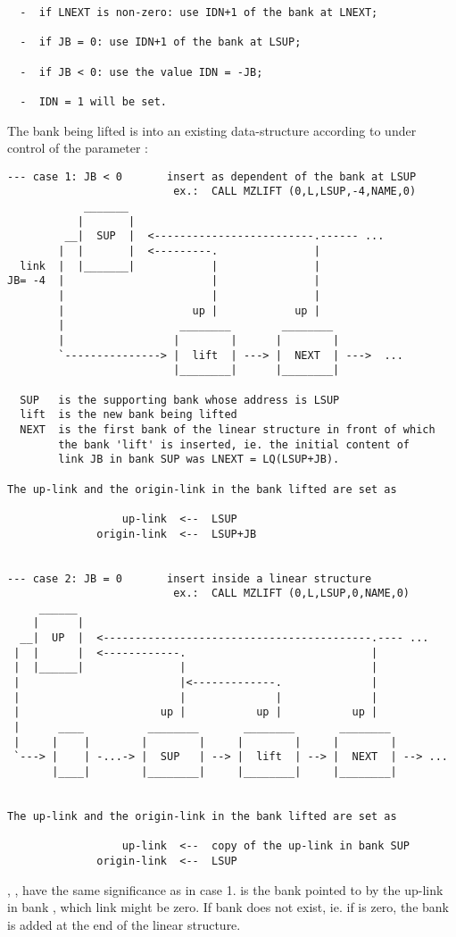 \begin{verbatim}
  -  if LNEXT is non-zero: use IDN+1 of the bank at LNEXT;

  -  if JB = 0: use IDN+1 of the bank at LSUP;

  -  if JB < 0: use the value IDN = -JB;

  -  IDN = 1 will be set.
\end{verbatim} 

The bank being lifted is 
into an existing data-structure according to 
under control of the parameter :

\begin{verbatim}
--- case 1: JB < 0       insert as dependent of the bank at LSUP
                          ex.:  CALL MZLIFT (0,L,LSUP,-4,NAME,0)
            _______
           |       |
         __|  SUP  |  <-------------------------.------ ...
        |  |       |  <---------.               |
  link  |  |_______|            |               |
JB= -4  |                       |               |
        |                       |               |
        |                    up |            up |
        |                  ________        ________
        |                 |        |      |        |
        `---------------> |  lift  | ---> |  NEXT  | --->  ...
                          |________|      |________|

  SUP   is the supporting bank whose address is LSUP
  lift  is the new bank being lifted
  NEXT  is the first bank of the linear structure in front of which
        the bank 'lift' is inserted, ie. the initial content of
        link JB in bank SUP was LNEXT = LQ(LSUP+JB).

The up-link and the origin-link in the bank lifted are set as

                  up-link  <--  LSUP
              origin-link  <--  LSUP+JB


--- case 2: JB = 0       insert inside a linear structure
                          ex.:  CALL MZLIFT (0,L,LSUP,0,NAME,0)
     ______
    |      |
  __|  UP  |  <------------------------------------------.---- ...
 |  |      |  <------------.                             |
 |  |______|               |                             |
 |                         |<-------------.              |
 |                         |              |              |
 |                      up |           up |           up |
 |      ____          ________       ________       ________
 |     |    |        |        |     |        |     |        |
 `---> |    | -...-> |  SUP   | --> |  lift  | --> |  NEXT  | --> ...
       |____|        |________|     |________|     |________|


The up-link and the origin-link in the bank lifted are set as

                  up-link  <--  copy of the up-link in bank SUP
              origin-link  <--  LSUP
\end{verbatim} 
, ,  have the same significance as in case 1.
 is the bank pointed to by the up-link in bank ,
which link might be zero.
If bank  does not exist, ie. if  is zero,
the bank  is added at the end of the linear structure.


